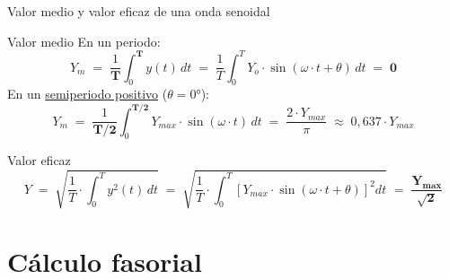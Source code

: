 \documentclass[aspectratio=169, usenames,svgnames,dvipsnames]{beamer}
\begin{document}

\begin{frame}{Valor medio y valor eficaz de una onda senoidal}
    \begin{block}{Valor medio}
        En un periodo: \[
        Y_m
        \; = \;
        \frac{1}{\boldsymbol{T}}\int_{0}^{\boldsymbol{T}}y(t)\, dt 
        \; = \;
        \frac{1}{T}\int_{0}^{T}Y_{o}\cdot\sin(\omega \cdot t +\theta)\, dt 
        \; = \;
        \boxed{\boldsymbol{0}}
        \]
        En un \href{https://raw.githubusercontent.com/ETSIDI-IE/tc/master/docs/ejercicios_clase/TC1_02_Ym_semiperiodo_senoidal_LBB.pdf}{semiperiodo positivo} ($\theta = \ang{0}$): \[
        Y_m
        \; = \;
        \frac{1}{\boldsymbol{T/2}}\int_{0}^{\boldsymbol{T/2}}Y_{max}\cdot\sin(\omega \cdot t)\, dt 
        \; = \;
        \dfrac{2\cdot Y_{max}}{\pi}
        \; \approx \; 
        0,637\cdot Y_{max}
        \]
    \end{block}
    
    \begin{block}{Valor eficaz}
        \[
        Y 
        \; = \; 
        \sqrt{\frac{1}{T}\cdot\int_{0}^{T}y^{2}(t)\, dt} 
        \; = \;
        \sqrt{\frac{1}{T}\cdot\int_{0}^{T}\left[Y_{max}\cdot\sin(\omega\cdot t+\theta)\right]^{2}dt}
        \; = \;
        \boxed{\boldsymbol{\frac{Y_{max}}{\sqrt{2}}}}
        \]
    \end{block}
\end{frame}


\section{Cálculo fasorial}
\end{document}
